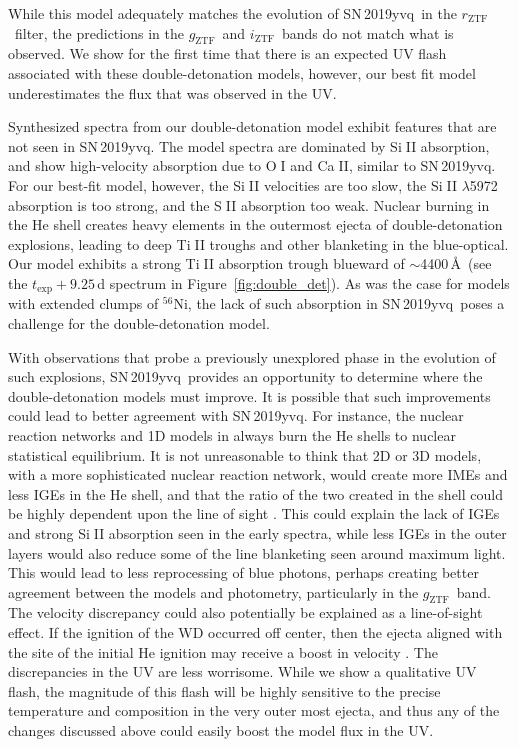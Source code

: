 \documentclass[twocolumn]{aastex63}
\def\ion#1#2{#1$\;${\footnotesize\rm{#2}}\relax}
\newcommand{\rztf}{$r_\mathrm{ZTF}$}
\newcommand{\gztf}{$g_\mathrm{ZTF}$}
\newcommand{\iztf}{$i_\mathrm{ZTF}$}
\newcommand{\radni}{$^{56}$Ni}
\newcommand{\sn}{SN\,2019yvq}
\begin{document}
While this model adequately matches the evolution of \sn\ in the \rztf\
filter, the predictions in the \gztf\ and \iztf\ bands do not match what is
observed. We show for the first time that there is an expected UV flash
associated with these double-detonation models, however, our best fit model
underestimates the flux that was observed in the UV.

Synthesized spectra from our double-detonation model exhibit features that are
not seen in \sn. The model spectra are dominated by \ion{Si}{II} absorption,
and show high-velocity absorption due to \ion{O}{I} and \ion{Ca}{II}, similar
to \sn. For our best-fit model, however, the \ion{Si}{II} velocities are too
slow, the \ion{Si}{II} $\lambda$5972 absorption is too strong, and the
\ion{S}{II} absorption too weak. Nuclear burning in the He shell creates heavy
elements in the outermost ejecta of double-detonation explosions, leading to
deep \ion{Ti}{II} troughs and other blanketing in the blue-optical. Our model
exhibits a strong \ion{Ti}{II} absorption trough blueward of $\sim$4400\,\AA\
(see the $t_\mathrm{exp} + 9.25$\,d spectrum in Figure~\ref{fig:double_det}).
As was the case for models with extended clumps of \radni, the lack of such
absorption in \sn\ poses a challenge for the double-detonation model.

With observations that probe a previously unexplored phase in the evolution of
such explosions, \sn\ provides an opportunity to determine where the
double-detonation models must improve. It is possible that such improvements
could lead to better agreement with \sn. For instance, the nuclear reaction
networks and 1D models in \citet{Polin19} always burn the He shells to nuclear
statistical equilibrium. It is not unreasonable to think that 2D or 3D models,
with a more sophisticated nuclear reaction network, would create more IMEs and
less IGEs in the He shell, and that the ratio of the two created in the shell
could be highly dependent upon the line of sight \citep[initial work along
these lines is presented in][however, the nuclear yields are only mildly
different from 1D models]{Gronow20}. This could explain the lack of IGEs and
strong \ion{Si}{II} absorption seen in the early spectra, while less IGEs in
the outer layers would also reduce some of the line blanketing seen around
maximum light. This would lead to less reprocessing of blue photons, perhaps
creating better agreement between the models and photometry, particularly in
the \gztf\ band. The velocity discrepancy could also potentially be explained
as a line-of-sight effect. If the ignition of the WD occurred off center, then
the ejecta aligned with the site of the initial He ignition may receive a
boost in velocity \citep[e.g.,][]{Kromer10}. The discrepancies in the UV are
less worrisome. While we show a qualitative UV flash, the magnitude of this
flash will be highly sensitive to the precise temperature and composition in
the very outer most ejecta, and thus any of the changes discussed above could
easily boost the model flux in the UV.
\end{document}
